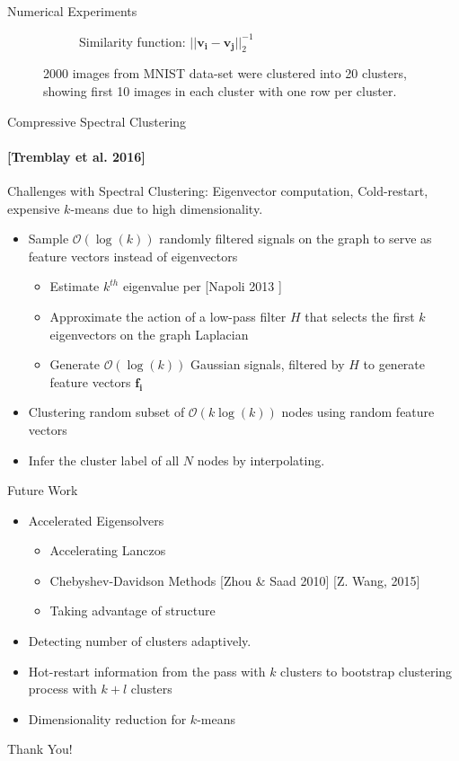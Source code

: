 \documentclass[10pt,a4paper, nocenter]{beamer}
\begin{document}
\begin{frame}{Numerical Experiments}
\begin{figure}[h]
\begin{center}
\begin{subfigure}[b]{0.4\textwidth}
					\caption{Similarity function: $\lvert \lvert \mathbf{v_i} - \mathbf{v_j} \rvert \rvert_2^{-1}$}
					\label{fig:clustering_20_2norm}
				\end{subfigure}
			\end{center}
			\caption{2000 images from MNIST data-set were clustered into 20 clusters, showing first 10 images in each cluster with one row per cluster. }
			\label{fig:mnistImages}
		\end{figure}
	\end{frame}
	
	\begin{frame}{Compressive Spectral Clustering}
		\framesubtitle{[Tremblay et al. 2016]}
		Challenges with Spectral Clustering: Eigenvector computation, Cold-restart, expensive $k$-means due to high dimensionality.
		\begin{itemize}
			\item<2-> Sample $\mathcal{O}(\log(k))$ randomly filtered signals on the graph to serve as feature vectors instead of eigenvectors
			\begin{itemize}
				\item Estimate $k^{th}$ eigenvalue per [Napoli 2013	]
				\item Approximate the action of a low-pass filter $H$ that selects the first $k$ eigenvectors on the graph Laplacian
				\item Generate $\mathcal{O}(\log(k))$ Gaussian signals, filtered by $H$ to generate feature vectors $\mathbf{f_i}$
			\end{itemize}
			\item<3-> Clustering random subset of $\mathcal{O}(k\log(k))$ nodes using random feature vectors 
			\item<4-> Infer the cluster label of all $N$ nodes by interpolating. 
		\end{itemize}
		
	\end{frame}

	\begin{frame}{Future Work}
		\begin{itemize}
			\item Accelerated Eigensolvers
			\begin{itemize}
				\item Accelerating Lanczos
				\item Chebyshev-Davidson Methods	 [Zhou \& Saad 2010] [Z. Wang, 2015]
				\item Taking advantage of structure				
			\end{itemize}
			\item Detecting number of clusters adaptively.
			\item Hot-restart information from the pass with $k$ clusters to bootstrap clustering process with $k+l$ clusters 
			\item Dimensionality reduction for $k$-means
		\end{itemize}
	\end{frame}
	
	\begin{frame}
		\centering
		Thank You!
		
	\end{frame}
	 
\end{document}
